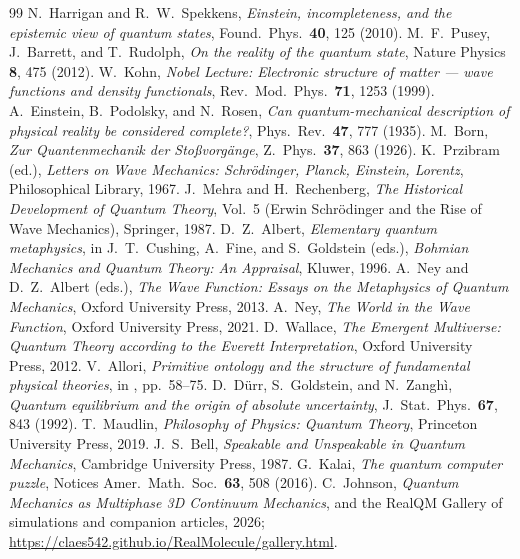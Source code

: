 \documentclass[11pt]{article}
\begin{document}
\begin{thebibliography}{99}
 N.~Harrigan and R.~W.~Spekkens, \emph{Einstein, incompleteness, and the epistemic view
of quantum states}, Found.\ Phys.\ \textbf{40}, 125 (2010).
 M.~F.~Pusey, J.~Barrett, and T.~Rudolph, \emph{On the reality of the quantum state}, Nature
Physics \textbf{8}, 475 (2012).
 W.~Kohn, \emph{Nobel Lecture: Electronic structure of matter --- wave functions and density
functionals}, Rev.\ Mod.\ Phys.\ \textbf{71}, 1253 (1999).
 A.~Einstein, B.~Podolsky, and N.~Rosen, \emph{Can quantum-mechanical description of physical
reality be considered complete?}, Phys.\ Rev.\ \textbf{47}, 777 (1935).
 M.~Born, \emph{Zur Quantenmechanik der Sto\ss vorg\"ange}, Z.\ Phys.\ \textbf{37}, 863 (1926).
 K.~Przibram (ed.), \emph{Letters on Wave Mechanics: Schr\"odinger, Planck, Einstein,
Lorentz}, Philosophical Library, 1967.
 J.~Mehra and H.~Rechenberg, \emph{The Historical Development of Quantum Theory},
Vol.~5 (Erwin Schr\"odinger and the Rise of Wave Mechanics), Springer, 1987.
 D.~Z.~Albert, \emph{Elementary quantum metaphysics}, in J.~T.~Cushing, A.~Fine, and S.~Goldstein
(eds.), \emph{Bohmian Mechanics and Quantum Theory: An Appraisal}, Kluwer, 1996.
 A.~Ney and D.~Z.~Albert (eds.), \emph{The Wave Function: Essays on the Metaphysics of Quantum
Mechanics}, Oxford University Press, 2013.
 A.~Ney, \emph{The World in the Wave Function}, Oxford University Press, 2021.
 D.~Wallace, \emph{The Emergent Multiverse: Quantum Theory according to the Everett
Interpretation}, Oxford University Press, 2012.
 V.~Allori, \emph{Primitive ontology and the structure of fundamental physical theories}, in
\cite{NeyAlbert}, pp.~58--75.
 D.~D\"urr, S.~Goldstein, and N.~Zangh\`i, \emph{Quantum equilibrium and the origin of absolute
uncertainty}, J.\ Stat.\ Phys.\ \textbf{67}, 843 (1992).
 T.~Maudlin, \emph{Philosophy of Physics: Quantum Theory}, Princeton University Press, 2019.
 J.~S.~Bell, \emph{Speakable and Unspeakable in Quantum Mechanics}, Cambridge University Press,
1987.
 G.~Kalai, \emph{The quantum computer puzzle}, Notices Amer.\ Math.\ Soc.\ \textbf{63}, 508
(2016).
 C.~Johnson, \emph{Quantum Mechanics as Multiphase 3D Continuum Mechanics}, and the RealQM
Gallery of simulations and companion articles, 2026; \url{https://claes542.github.io/RealMolecule/gallery.html}.
\end{thebibliography}
\end{document}
